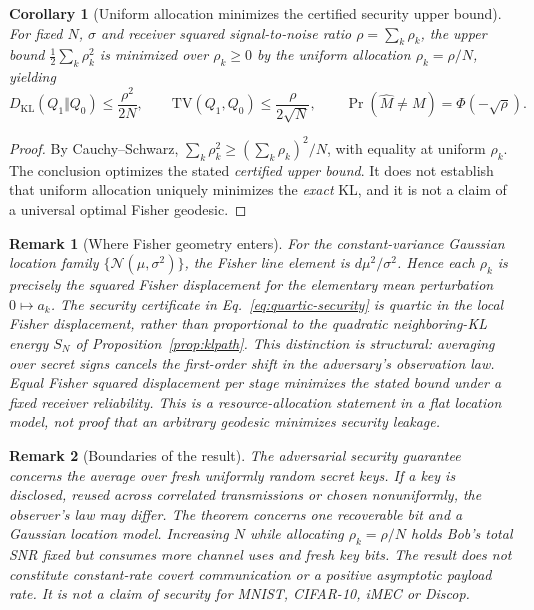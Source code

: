 \documentclass[preprint,12pt]{elsarticle}
\newtheorem{corollary}{Corollary}
\newtheorem{remark}{Remark}
\newcommand{\KL}{D_{\mathrm{KL}}}
\newcommand{\TV}{\mathrm{TV}}
\newcommand{\cN}{\mathcal N}
\newcommand{\PhiN}{\Phi}
\begin{document}
\begin{corollary}[Uniform allocation minimizes the certified
security upper bound]
\label{cor:uniform}
For fixed $N$, $\sigma$ and receiver squared
signal-to-noise ratio $\rho=\sum_k\rho_k$,
the upper bound $\tfrac12\sum_k\rho_k^2$ is
minimized over $\rho_k\ge0$ by the uniform
allocation $\rho_k=\rho/N$, yielding
\begin{equation}
\KL(Q_1\Vert Q_0)\le\frac{\rho^2}{2N},
\qquad
\TV(Q_1,Q_0)\le\frac{\rho}{2\sqrt N},
\qquad
\Pr(\widehat M\ne M)=\PhiN(-\sqrt\rho).
\label{eq:allocation}
\end{equation}
\end{corollary}
\begin{proof}
By Cauchy--Schwarz,
$\sum_k\rho_k^2\ge
(\sum_k\rho_k)^2/N$, with equality
at uniform $\rho_k$.
The conclusion optimizes the stated \emph{certified
upper bound}. It does not establish that uniform
allocation uniquely minimizes the \emph{exact} KL,
and it is not a claim of a universal optimal
Fisher geodesic.
\end{proof}


\begin{remark}[Where Fisher geometry enters]
\label{rem:geometrysecurity}
For the constant-variance Gaussian location family
$\{\cN(\mu,\sigma^2)\}$, the Fisher line element is
$d\mu^2/\sigma^2$. Hence each $\rho_k$ is precisely
the squared Fisher displacement for the elementary
mean perturbation $0\mapsto a_k$.
The security certificate in
Eq.~\eqref{eq:quartic-security} is
\emph{quartic} in the local Fisher displacement,
rather than proportional to the quadratic
neighboring-KL energy
$S_N$ of Proposition~\ref{prop:klpath}.
This distinction is structural: averaging over
secret signs cancels the first-order shift in the
adversary's observation law.
Equal Fisher squared displacement per stage
minimizes the stated bound under a fixed
receiver reliability. This is a
\emph{resource-allocation} statement in a
flat location model, not proof that an arbitrary
geodesic minimizes security leakage.
\end{remark}


\begin{remark}[Boundaries of the result]
The adversarial security guarantee concerns the
\emph{average over fresh uniformly random secret keys}.
If a key is disclosed, reused across correlated
transmissions or chosen nonuniformly, the
observer's law may differ. The theorem concerns
one recoverable bit and a Gaussian location
model. Increasing $N$ while allocating
$\rho_k=\rho/N$ holds Bob's total SNR fixed
but consumes more channel uses and fresh key bits.
The result does not constitute constant-rate
covert communication or a positive asymptotic
payload rate. It is not a claim of security for
MNIST, CIFAR-10, iMEC or Discop.
\end{remark}
\end{document}
